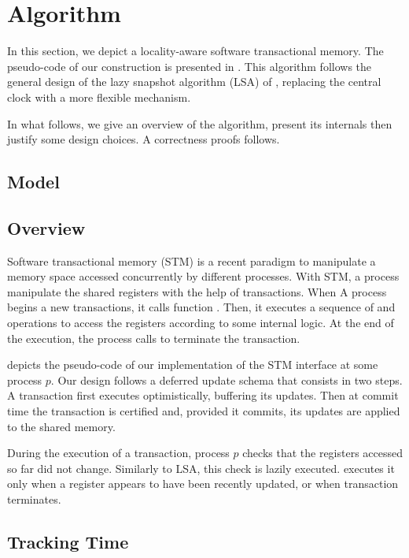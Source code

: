 \section{Algorithm}

In this section, we depict a locality-aware software transactional memory.
The pseudo-code of our construction is presented in .
This algorithm follows the general design of the lazy snapshot algorithm (LSA) of \citet{FelberFMR10}, replacing the central clock with a more flexible mechanism.

In what follows, we give an overview of the algorithm, present its internals then justify some design choices.
A correctness proofs follows.

\subsection{Model}


\subsection{Overview}

Software transactional memory (STM) is a recent paradigm to manipulate a memory space accessed concurrently by different processes.
With STM, a process manipulate the shared registers with the help of transactions.
When A process begins a new transactions, it calls function \stmStartFunction.
Then, it executes a sequence of \stmReadFunction and \stmWriteFunction operations to access the registers according to some internal logic.
At the end of the execution, the process calls \stmTryCommitFunction to terminate the transaction.

 depicts the pseudo-code of our implementation of the STM interface at some process $p$.
Our design follows a deferred update schema that consists in two steps.
A transaction first executes optimistically, buffering its updates.
Then at commit time the transaction is certified and, provided it commits, its updates are applied to the shared memory.

During the execution of a transaction, process $p$ checks that the registers accessed so far did not change.
Similarly to LSA, this check is lazily executed.
 executes it only when a register appears to have been recently updated, or when transaction terminates.

\subsection{Tracking Time}

